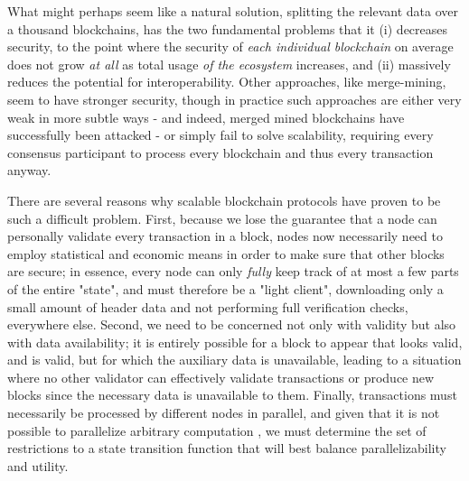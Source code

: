 \documentclass[11pt,a4paper]{report}
\theoremstyle{plain}
\theoremstyle{definition}
\theoremstyle{remark}
\begin{document}
What might perhaps seem like a natural solution, splitting the relevant data over a thousand blockchains, has the two fundamental problems that it (i) decreases security, to the point where the security of \emph{each individual blockchain} on average does not grow \emph{at all} as total usage \emph{of the ecosystem} increases, and (ii) massively reduces the potential for interoperability. Other approaches, like merge-mining, seem to have stronger security, though in practice such approaches are either very weak in more subtle ways \citep{todd_re:_2013} - and indeed, merged mined blockchains have successfully been attacked\citep{piasecki_what_2012} - or simply fail to solve scalability, requiring every consensus participant to process every blockchain and thus every transaction anyway.

There are several reasons why scalable blockchain protocols have proven to be such a difficult problem. First, because we lose the guarantee that a node can personally validate every transaction in a block, nodes now necessarily need to employ statistical and economic means in order to make sure that other blocks are secure; in essence, every node can only \emph{fully} keep track of at most a few parts of the entire "state", and must therefore be a "light client", downloading only a small amount of header data and not performing full verification checks, everywhere else. Second, we need to be concerned not only with validity but also with data availability; it is entirely possible for a block to appear that looks valid, and is valid, but for which the auxiliary data is unavailable, leading to a situation where no other validator can effectively validate transactions or produce new blocks since the necessary data is unavailable to them. Finally, transactions must necessarily be processed by different nodes in parallel, and given that it is not possible to parallelize arbitrary computation \citep{amdahl_validity_1967,gustafson_reevaluating_1988}, we must determine the set of restrictions to a state transition function that will best balance parallelizability and utility.
\end{document}
